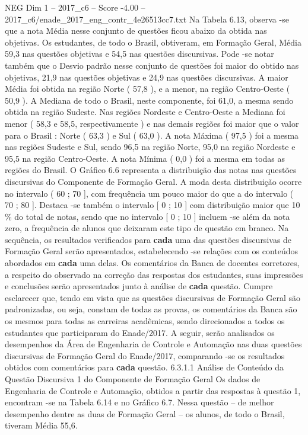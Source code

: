 \begin{textsample}{NEG Dim 1 – 2017\_c6 – Score -4.00 – 2017\_c6/enade\_2017\_eng\_contr\_4e26513cc7.txt}
Na Tabela 6.13, observa -se que a nota Média nesse conjunto de questões ficou abaixo da obtida nas objetivas.
Os estudantes, de todo o Brasil, obtiveram, em Formação Geral, Média 59,3 nas questões objetivas e 54,5 nas questões discursivas.
Pode -se notar também que o Desvio padrão nesse conjunto de questões foi maior do obtido nas objetivas, 21,9 nas questões objetivas e 24,9 nas questões discursivas.
A maior Média foi obtida na região Norte ( 57,8 ), e a menor, na região Centro-Oeste ( 50,9 ).
A Mediana de todo o Brasil, neste componente, foi 61,0, a mesma sendo obtida na região Sudeste.
Nas regiões Nordeste e Centro-Oeste a Mediana foi menor ( 58,3 e 58,5, respectivamente ) e nas demais regiões foi maior que o valor para o Brasil : Norte ( 63,3 ) e Sul ( 63,0 ).
A nota Máxima ( 97,5 ) foi a mesma nas regiões Sudeste e Sul, sendo 96,5 na região Norte, 95,0 na região Nordeste e 95,5 na região Centro-Oeste.
A nota Mínima ( 0,0 ) foi a mesma em todas as regiões do Brasil.
O Gráfico 6.6 representa a distribuição das notas nas questões discursivas do Componente de Formação Geral.
A moda desta distribuição ocorre no intervalo ( 60 ; 70 ], com frequência um pouco maior do que a do intervalo ( 70 ; 80 ].
Destaca -se também o intervalo [ 0 ; 10 ] com distribuição maior que 10 \% do total de notas, sendo que no intervalo [ 0 ; 10 ] incluem -se além da nota zero, a frequência de alunos que deixaram este tipo de questão em branco.
Na sequência, os resultados verificados para \textbf{cada} uma das questões discursivas de Formação Geral serão apresentados, estabelecendo -se relações com os conteúdos abordados em \textbf{cada} uma delas.
Os comentários da Banca de docentes corretores, a respeito do observado na correção das respostas dos estudantes, suas impressões e conclusões serão apresentados junto à análise de \textbf{cada} questão.
Cumpre esclarecer que, tendo em vista que as questões discursivas de Formação Geral são padronizadas, ou seja, constam de todas as provas, os comentários da Banca são os mesmos para todas as carreiras acadêmicas, sendo direcionados a todos os estudantes que participaram do Enade/2017.
A seguir, serão analisados os desempenhos da Área de Engenharia de Controle e Automação nas duas questões discursivas de Formação Geral do Enade/2017, comparando -se os resultados obtidos com comentários para \textbf{cada} questão. 6.3.1.1 Análise de Conteúdo da Questão Discursiva 1 do Componente de Formação Geral Os dados de Engenharia de Controle e Automação, obtidos a partir das respostas à questão 1, encontram -se na Tabela 6.14 e no Gráfico 6.7.
Nessa questão – de melhor desempenho dentre as duas de Formação Geral – os alunos, de todo o Brasil, tiveram Média 55,6.

\end{textsample}
